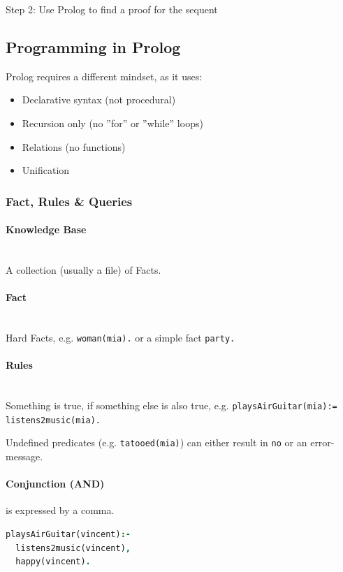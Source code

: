 Step 2: Use Prolog to find a proof for the sequent

\subsection{Programming in Prolog}
Prolog requires a different mindset, as it uses:
\begin{itemize}
	\item Declarative syntax (not procedural)
	\item Recursion only (no ''for'' or ''while'' loops)
	\item Relations (no functions)
	\item Unification
\end{itemize}

\subsubsection{Fact, Rules \& Queries}

\paragraph{Knowledge Base} \hfill \\
	A collection (usually a file) of Facts.

\paragraph{Fact} \hfill \\
	Hard Facts, e.g. \lstinline|woman(mia).| or a simple fact \lstinline|party.|

\paragraph{Rules} \hfill \\
	Something is true, if something else is also true, e.g.  \lstinline|playsAirGuitar(mia):= listens2music(mia).|


Undefined predicates (e.g. \lstinline|tatooed(mia)|) can either result in \lstinline|no| or an error-message.

\paragraph{Conjunction (AND)}

is expressed by a comma.
\begin{lstlisting}[language=Prolog]
playsAirGuitar(vincent):-
  listens2music(vincent),
  happy(vincent).
\end{lstlisting}


